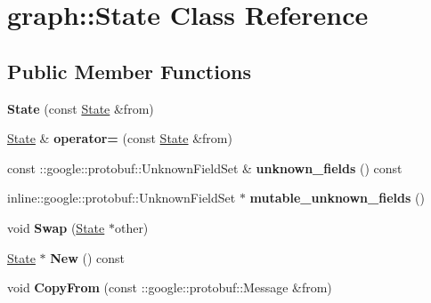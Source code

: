 \hypertarget{classgraph_1_1State}{
\section{graph::State Class Reference}
\label{classgraph_1_1State}
}
\subsection*{Public Member Functions}
\begin{DoxyCompactItemize}
\item 
\hypertarget{classgraph_1_1State_adbd7ef24b794167795d267dfbd1d0646}{
{\bfseries State} (const \hyperlink{classgraph_1_1State}{State} \&from)}
\label{classgraph_1_1State_adbd7ef24b794167795d267dfbd1d0646}

\item 
\hypertarget{classgraph_1_1State_ae565f2fef5dc685a53d67b1449672d53}{
\hyperlink{classgraph_1_1State}{State} \& {\bfseries operator=} (const \hyperlink{classgraph_1_1State}{State} \&from)}
\label{classgraph_1_1State_ae565f2fef5dc685a53d67b1449672d53}

\item 
\hypertarget{classgraph_1_1State_a6949f7b56f23e1f22f6ffd92cb22a339}{
const ::google::protobuf::UnknownFieldSet \& {\bfseries unknown\_\-fields} () const }
\label{classgraph_1_1State_a6949f7b56f23e1f22f6ffd92cb22a339}

\item 
\hypertarget{classgraph_1_1State_a7449bfa3aeb18cae2903328f38734898}{
inline::google::protobuf::UnknownFieldSet $\ast$ {\bfseries mutable\_\-unknown\_\-fields} ()}
\label{classgraph_1_1State_a7449bfa3aeb18cae2903328f38734898}

\item 
\hypertarget{classgraph_1_1State_affd9e019264a3a2416563d91dbed1f27}{
void {\bfseries Swap} (\hyperlink{classgraph_1_1State}{State} $\ast$other)}
\label{classgraph_1_1State_affd9e019264a3a2416563d91dbed1f27}

\item 
\hypertarget{classgraph_1_1State_a28b26e430542a30cfe3b79a0b86eacb2}{
\hyperlink{classgraph_1_1State}{State} $\ast$ {\bfseries New} () const }
\label{classgraph_1_1State_a28b26e430542a30cfe3b79a0b86eacb2}

\item 
\hypertarget{classgraph_1_1State_a9f329c3d5f8b4d2e42c7a7b8e9b2a5e6}{
void {\bfseries CopyFrom} (const ::google::protobuf::Message \&from)}
\label{classgraph_1_1State_a9f329c3d5f8b4d2e42c7a7b8e9b2a5e6}


\end{DoxyCompactItemize}
